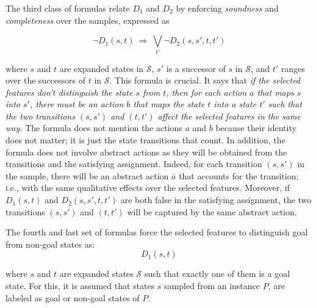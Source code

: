 \documentclass[letterpaper]{article} %
\newcommand{\Omit}[1]{}
\renewcommand{\S}{\mathcal{S}}
\begin{document}
The third class of formulas relate $D_1$ and $D_2$ by enforcing \emph{soundness}
and \emph{completeness} over  the samples, expressed as
\Omit{
Since the abstract actions  are not given,
the qualitative changes in each  transition $(s,s')$ in $\S$
are  taken as templates  of abstract actions. Thus, if $s$ and $t$ are not distinguished by the selected features, 
for each transition $(s, s') \in \S$, there must be a transition $(t, t') \in \S$
such that the two transitions are not distinguished by the selected features either.
This is expressed as
}
%
\begin{equation}
  \label{eq:bridge1}
  \neg D_1(s, t) \  \Rightarrow\ \textstyle\bigvee_{t'} \neg D_2(s, s', t, t')
\end{equation}

\noindent where $s$ and $t$ are expanded states in  $\S$, $s'$ is a successor of $s$ in $\S$,
and $t'$ ranges over the successors of $t$ in $\S$. This formula is crucial. 
It says that \emph{if the selected features don't distinguish the state $s$ from $t$,
then for each action $a$ that maps  $s$ into $s'$, there must be an action $b$ that maps the state
$t$ into a state $t'$ such that the two transitions $(s,s')$ and $(t,t')$ affect the selected features
in the same way.} The formula does not mention the actions $a$ and $b$ because their identity does not matter;
it is just the state transitions that count. In addition, the formula does not involve abstract actions as they
will be obtained from the transitions and  the satisfying assignment. Indeed, for each transition $(s,s')$ in the sample, there will be
an abstract action $\bar{a}$ that  accounts for the transition; i.e., with the  same qualitative effects over the selected features.
Moreover, if $D_1(s,t)$ and $D_2(s,s',t,t')$ are both false in the satisfying assignment, the two transitions $(s,s')$ and $(t,t')$
will be captured by the same abstract action.


The fourth and  last set of formulas force the selected features to distinguish goal from non-goal states as:
\begin{equation}
  \label{eq:goal}
  D_1(s,t) 
\end{equation}

\noindent where  $s$ and $t$  are expanded states  $\S$ such that exactly one of them is a goal state. 
For this, it is assumed that  states $s$ sampled from an instance $P$, are labeled as goal or non-goal states
of $P$.
\end{document}

